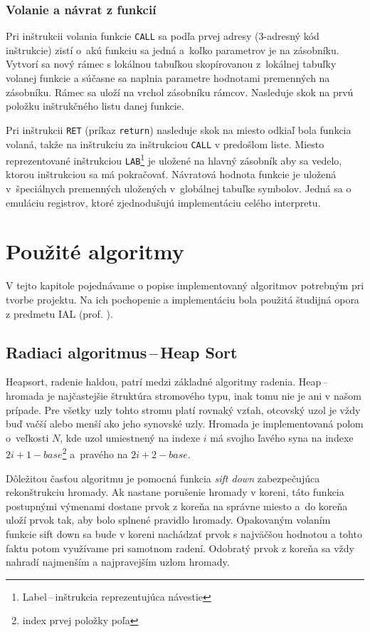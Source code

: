 \documentclass[11pt,a4paper]{article}
\begin{document}
	\subsubsection{Volanie a návrat z funkcií}
	\label{funkcia}
	Pri inštrukcii volania funkcie \texttt{CALL} sa podľa prvej adresy
	(3-adresný kód inštrukcie) zistí o~akú funkciu sa jedná a~koľko parametrov
	je na zásobníku. Vytvorí sa nový rámec s lokálnou tabuľkou skopírovanou
	z~lokálnej tabuľky volanej funkcie a súčasne sa naplnia parametre
	hodnotami premenných na zásobníku. Rámec sa uloží na vrchol zásobníku rámcov.
	Nasleduje skok na prvú položku inštrukčného listu danej funkcie.


	Pri inštrukcii \texttt{RET} (príkaz \texttt{return}) nasleduje skok na
	miesto odkiaľ bola funkcia volaná, takže na inštrukciu za inštrukciou
	\texttt{CALL} v predošlom liste. Miesto reprezentované inštrukciou
	\texttt{LAB}\footnote{Label\,--\,inštrukcia reprezentujúca návestie}
	je uložené na hlavný zásobník aby sa vedelo, ktorou inštrukciou
	sa má pokračovať. Návratová hodnota funkcie je uložená v~špeciálnych
	premenných uložených v~globálnej tabuľke symbolov. Jedná sa o emuláciu
	registrov, ktoré zjednodušujú implementáciu celého interpretu.




	\section{Použité algoritmy}
	\label{algoritmy}

	V tejto kapitole pojednávame o popise implementovaný algoritmov potrebným pri tvorbe projektu. Na ich pochopenie a implementáciu bola použitá študijná opora z predmetu IAL (prof. \cite{opora}).

	\subsection{Radiaci algoritmus\,--\,Heap Sort}

	Heapsort, radenie haldou, patrí medzi základné algoritmy radenia. Heap\,--\,hromada je
	najčastejšie štruktúra stromového typu, inak tomu nie je ani v našom prípade.
	Pre všetky uzly tohto stromu platí rovnaký vzťah, otcovský uzol je vždy buď
	vačší alebo menší ako jeho synovské uzly. Hromada je implementovaná polom o~veľkosti $N$,
	kde uzol umiestnený na indexe $i$ má svojho ľavého syna na indexe
	$2i+1-base$\footnote{index prvej položky poľa} a~pravého na $2i+2-base$.

	Dôležitou časťou algoritmu je pomocná funkcia \textit{sift down} zabezpečujúca rekonštrukciu hromady. Ak nastane porušenie hromady v koreni, táto funkcia postupnými výmenami dostane prvok z koreňa na správne miesto a~do koreňa uloží prvok tak, aby bolo splnené pravidlo hromady. Opakovaným volaním funkcie sift down sa bude v koreni nachádzať prvok s najväčšou hodnotou a tohto faktu potom využívame pri samotnom radení. Odobratý prvok z koreňa sa vždy nahradí najmenším a najpravejším uzlom hromady.
\end{document}
